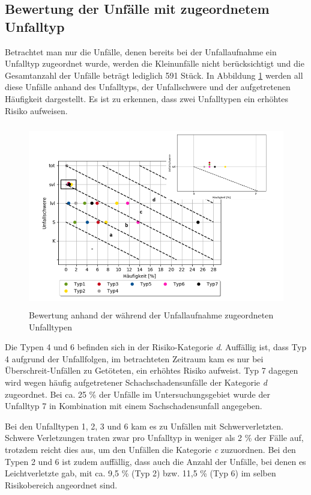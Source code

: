 \subsection{Bewertung der Unfälle mit zugeordnetem Unfalltyp}
Betrachtet man nur die Unfälle, denen bereits bei der Unfallaufnahme ein Unfalltyp zugeordnet wurde, werden die Kleinunfälle nicht berücksichtigt und die Gesamtanzahl der Unfälle beträgt lediglich 591 Stück. In Abbildung \ref{fig:Bewertung_UT} werden all diese Unfälle anhand des Unfalltyps, der Unfallschwere und der aufgetretenen Häufigkeit dargestellt. Es ist zu erkennen, dass zwei Unfalltypen ein erhöhtes Risiko aufweisen.

\begin{savenotes}
	\begin{figure}[H]
		\centering
		\includegraphics[width=12cm,height=8cm]{figures/Bewertung_UT}
		\caption[Bewertung anhand der während der Unfallaufnahme zugeordneten Unfalltypen]{Bewertung anhand der während der Unfallaufnahme zugeordneten Unfalltypen}\label{fig:Bewertung_UT}
	\end{figure}
\end{savenotes}

Die Typen 4 und 6 befinden sich in der Risiko-Kategorie \textit{d}. Auffällig ist, dass Typ 4 aufgrund der Unfallfolgen, im  betrachteten Zeitraum kam es nur bei Überschreit-Unfällen zu Getöteten, ein erhöhtes Risiko aufweist. Typ 7 dagegen wird wegen häufig aufgetretener Schachschadensunfälle der Kategorie \textit{d} zugeordnet. Bei ca. 25 \% der Unfälle im Untersuchungsgebiet wurde der Unfalltyp 7 in Kombination mit einem Sachschadensunfall angegeben.

Bei den Unfalltypen 1, 2, 3 und 6 kam es zu Unfällen mit Schwerverletzten. Schwere Verletzungen traten zwar pro Unfalltyp in weniger als 2 \% der Fälle auf, trotzdem reicht dies aus, um den Unfällen die Kategorie \textit{c} zuzuordnen. Bei den Typen 2 und 6 ist zudem auffällig, dass auch die Anzahl der Unfälle, bei denen es Leichtverletzte gab, mit ca. 9,5 \% (Typ 2) bzw. 11,5 \% (Typ 6) im selben Risikobereich angeordnet sind.

